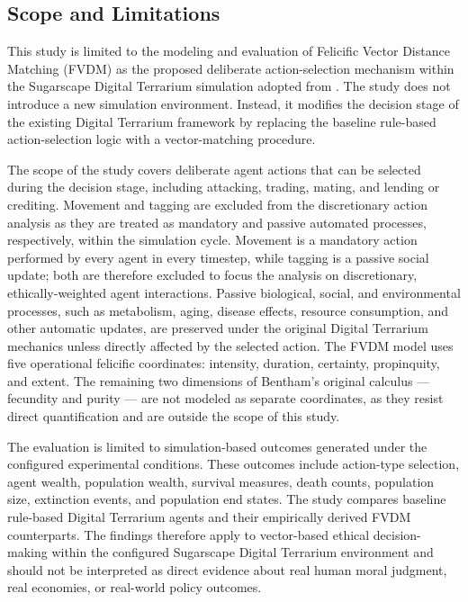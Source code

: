 \documentclass{icsthesis}
\begin{document}
\begin{mainmatter}
			\subsection{Scope and Limitations}

This study is limited to the modeling and evaluation of Felicific Vector Distance Matching (FVDM) as the proposed deliberate action-selection mechanism within the Sugarscape Digital Terrarium simulation adopted from \citet{KremerHerman2024b}. The study does not introduce a new simulation environment. Instead, it modifies the decision stage of the existing Digital Terrarium framework by replacing the baseline rule-based action-selection logic with a vector-matching procedure.

The scope of the study covers deliberate agent actions that can be selected during the decision stage, including attacking, trading, mating, and lending or crediting. Movement and tagging are excluded from the discretionary action analysis as they are treated as mandatory and passive automated processes, respectively, within the simulation cycle. Movement is a mandatory action performed by every agent in every timestep, while tagging is a passive social update; both are therefore excluded to focus the analysis on discretionary, ethically-weighted agent interactions. Passive biological, social, and environmental processes, such as metabolism, aging, disease effects, resource consumption, and other automatic updates, are preserved under the original Digital Terrarium mechanics unless directly affected by the selected action. The FVDM model uses five operational felicific coordinates: intensity, duration, certainty, propinquity, and extent. The remaining two dimensions of Bentham's original calculus --- fecundity and purity --- are not modeled as separate coordinates, as they resist direct quantification and are outside the scope of this study.

The evaluation is limited to simulation-based outcomes generated under the configured experimental conditions. These outcomes include action-type selection, agent wealth, population wealth, survival measures, death counts, population size, extinction events, and population end states. The study compares baseline rule-based Digital Terrarium agents and their empirically derived FVDM counterparts. The findings therefore apply to vector-based ethical decision-making within the configured Sugarscape Digital Terrarium environment and should not be interpreted as direct evidence about real human moral judgment, real economies, or real-world policy outcomes.


\end{mainmatter}
\end{document}
